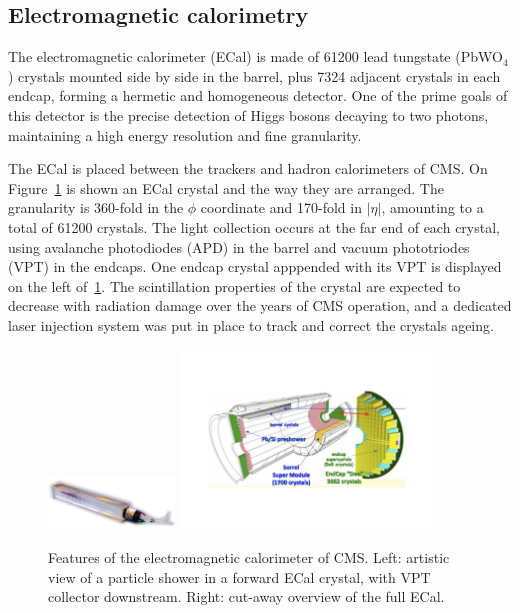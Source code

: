 \subsection{Electromagnetic calorimetry}
\label{sec:ECAL}
The electromagnetic calorimeter (ECal) is made of 61200 lead tungstate
(PbWO$_4$) crystals mounted side by side in the barrel, plus 7324
adjacent crystals in each endcap, forming a hermetic and homogeneous
detector. One of the prime goals of this detector is the precise
detection of Higgs bosons decaying to two photons, maintaining a high
energy resolution and fine granularity.

The ECal is placed between the trackers and hadron calorimeters of
CMS. On Figure~\ref{fig:ecal} is shown an ECal crystal and the way they
are arranged. The granularity is 360-fold in the $\phi$ coordinate and
170-fold in $\vert\eta\vert$, amounting to a total of 61200
crystals. The light collection occurs at the far end of each crystal,
using avalanche photodiodes (APD) in the barrel and vacuum
phototriodes (VPT) in the endcaps. One endcap crystal apppended with
its VPT is displayed on the left of~\ref{fig:ecal}. The scintillation
properties of the crystal are expected to decrease with radiation
damage over the years of CMS operation, and a dedicated laser
injection system was put in place to track and correct the crystals ageing.

\begin{figure}[htb]
  \begin{center}
    \includegraphics[width=0.3\textwidth]{Chapters/xLHCMS/CrystalWithVPTwithShower.png}
    \includegraphics[width=0.6\textwidth]{Chapters/xLHCMS/ecal.pdf}
    \caption{Features of the electromagnetic calorimeter of CMS. Left: artistic view of a particle shower in a forward ECal
      crystal, with VPT collector downstream. Right: cut-away overview of the
      full ECal.}
    \label{fig:ecal}
  \end{center}
\end{figure}

